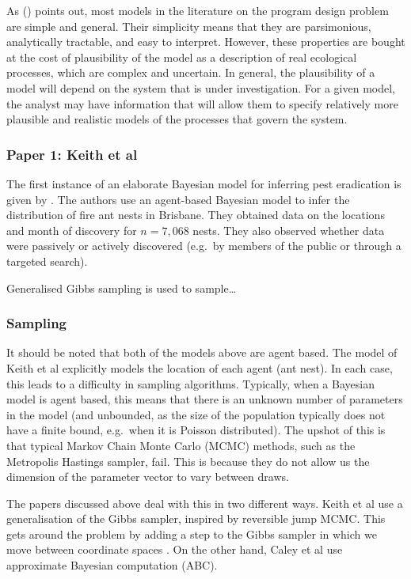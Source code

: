 \documentclass[
]{book}
\begin{document}
As (\citet{caley2014}) points out, most models in the literature on the program design problem are simple and general. Their simplicity means that they are parsimonious, analytically tractable, and easy to interpret. However, these properties are bought at the cost of plausibility of the model as a description of real ecological processes, which are complex and uncertain. In general, the plausibility of a model will depend on the system that is under investigation. For a given model, the analyst may have information that will allow them to specify relatively more plausible and realistic models of the processes that govern the system.

\hypertarget{paper-1-keith-et-al}{%
\subsubsection{Paper 1: Keith et al}\label{paper-1-keith-et-al}}

The first instance of an elaborate Bayesian model for inferring pest eradication is given by \citet{keith2013}. The authors use an agent-based Bayesian model to infer the distribution of fire ant nests in Brisbane. They obtained data on the locations and month of discovery for \(n = 7{,}068\) nests. They also observed whether data were passively or actively discovered (e.g.~by members of the public or through a targeted search).

Generalised Gibbs sampling is used to sample\ldots{}

\hypertarget{sampling}{%
\subsubsection{Sampling}\label{sampling}}

It should be noted that both of the models above are agent based. The model of Keith et al explicitly models the location of each agent (ant nest). In each case, this leads to a difficulty in sampling algorithms. Typically, when a Bayesian model is agent based, this means that there is an unknown number of parameters in the model (and unbounded, as the size of the population typically does not have a finite bound, e.g.~when it is Poisson distributed). The upshot of this is that typical Markov Chain Monte Carlo (MCMC) methods, such as the Metropolis Hastings sampler, fail. This is because they do not allow us the dimension of the parameter vector to vary between draws.

The papers discussed above deal with this in two different ways. Keith et al use a generalisation of the Gibbs sampler, inspired by reversible jump MCMC. This gets around the problem by adding a step to the Gibbs sampler in which we move between coordinate spaces . On the other hand, Caley et al use approximate Bayesian computation (ABC).
\end{document}
